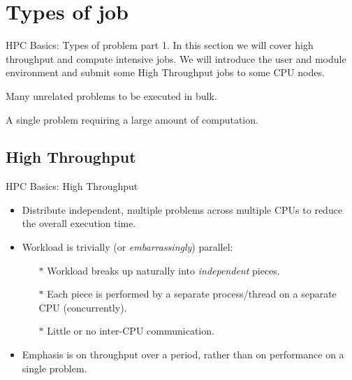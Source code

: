\section{Types of job}
\begin{frame}{HPC Basics: Types of problem part 1.}
In this section we will cover high throughput and compute intensive jobs. We will  introduce the user and module environment and submit some High Throughput jobs to some CPU nodes.
\begin{description}
\pause
\item[\textit{High Throughput:}]{Many unrelated problems to be executed in bulk.}
\pause
\item[\textit{Compute Intensive:}]{A single problem requiring a large amount of computation.}
\end{description}
\end{frame}

\subsection{High Throughput}
\begin{frame}{HPC Basics: High Throughput}
\begin{itemize}
\item{Distribute \alert{independent}, \alert{multiple problems} across multiple CPUs to reduce the overall execution time.}
\pause
\item{Workload is trivially (or \emph{embarrassingly}) parallel:}
\begin{itemize}
\item[$\ast$]{Workload breaks up naturally into \emph{independent} pieces.}
\item[$\ast$]{Each piece is performed by a separate process/thread on a separate CPU (concurrently).}
\item[$\ast$]{\alert{Little or no inter-CPU communication}.}
\end{itemize}
\pause
\item{Emphasis is on throughput over a period, rather than on performance on a single problem.}
\pause
\end{itemize}
\end{frame}

